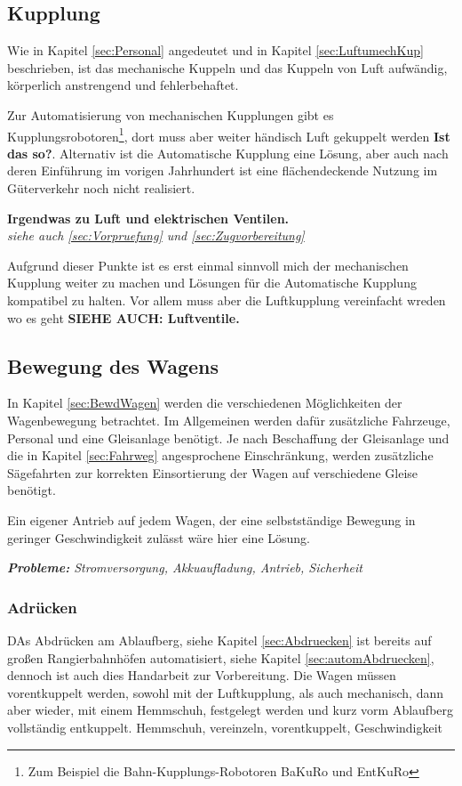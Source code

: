 \subsection{Kupplung}
Wie in Kapitel \ref{sec:Personal} angedeutet und in Kapitel \ref{sec:LuftumechKup} beschrieben, ist das mechanische Kuppeln und das Kuppeln von Luft aufwändig, körperlich anstrengend und fehlerbehaftet. \par
Zur Automatisierung von mechanischen Kupplungen gibt es Kupplungsrobotoren\footnote{Zum Beispiel die Bahn-Kupplungs-Robotoren BaKuRo und EntKuRo}, dort muss aber weiter händisch Luft gekuppelt werden \textbf{Ist das so?}. Alternativ ist die Automatische Kupplung eine Lösung, aber auch nach deren Einführung im vorigen Jahrhundert ist eine flächendeckende Nutzung im Güterverkehr noch nicht realisiert.\par
\textbf{Irgendwas zu Luft und elektrischen Ventilen.}\\
\textit{siehe auch \ref{sec:Vorpruefung} und \ref{sec:Zugvorbereitung}}
\par
Aufgrund dieser Punkte ist es erst einmal sinnvoll mich der mechanischen Kupplung weiter zu machen und Lösungen für die Automatische Kupplung kompatibel zu halten. Vor allem muss aber die Luftkupplung vereinfacht wreden wo es geht \textbf{ SIEHE AUCH: Luftventile.}

\subsection{Bewegung des Wagens}
In Kapitel \ref{sec:BewdWagen} werden die verschiedenen Möglichkeiten der Wagenbewegung betrachtet. Im Allgemeinen werden dafür zusätzliche Fahrzeuge, Personal und eine Gleisanlage benötigt. Je nach Beschaffung der Gleisanlage und die in Kapitel \ref{sec:Fahrweg} angesprochene Einschränkung, werden zusätzliche Sägefahrten zur korrekten Einsortierung der Wagen auf verschiedene Gleise benötigt. \par
Ein eigener Antrieb auf jedem Wagen, der eine selbstständige Bewegung in geringer Geschwindigkeit zulässt wäre hier eine Lösung.\par
\textit{\textbf{Probleme:} Stromversorgung, Akkuaufladung, Antrieb, Sicherheit}
\subsubsection{Adrücken}
DAs Abdrücken am Ablaufberg, siehe Kapitel \ref{sec:Abdruecken} ist bereits auf großen Rangierbahnhöfen automatisiert, siehe Kapitel \ref{sec:automAbdruecken}, dennoch ist auch dies Handarbeit zur Vorbereitung. Die Wagen müssen vorentkuppelt werden, sowohl mit der Luftkupplung, als auch mechanisch, dann aber wieder, mit einem Hemmschuh, festgelegt werden und kurz vorm Ablaufberg vollständig entkuppelt. 
Hemmschuh, vereinzeln, vorentkuppelt, Geschwindigkeit
